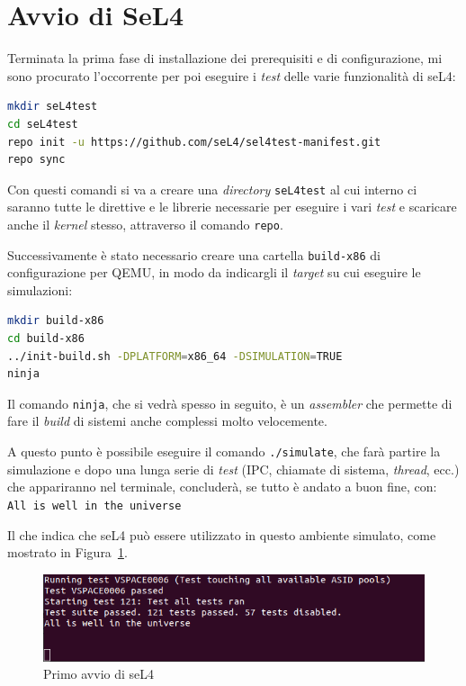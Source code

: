 \section{Avvio di SeL4}
Terminata la prima fase di installazione dei prerequisiti e di configurazione, mi sono procurato l'occorrente per poi eseguire i \textit{test} delle varie funzionalità di seL4:
\begin{lstlisting}[language=bash]
mkdir seL4test
cd seL4test
repo init -u https://github.com/seL4/sel4test-manifest.git
repo sync
\end{lstlisting}

Con questi comandi si va a creare una \textit{directory} \texttt{seL4test} al cui interno ci saranno tutte le direttive e le librerie necessarie per eseguire i vari \textit{test} e scaricare anche il \textit{kernel} stesso, attraverso il comando \texttt{repo}.

Successivamente è stato necessario creare una cartella \texttt{build-x86} di configurazione per QEMU, in modo da indicargli il \textit{target} su cui eseguire le simulazioni:
\begin{lstlisting}[language=bash]
mkdir build-x86
cd build-x86
../init-build.sh -DPLATFORM=x86_64 -DSIMULATION=TRUE
ninja
\end{lstlisting}

Il comando \texttt{ninja}, che si vedrà spesso in seguito, è un \textit{assembler} che permette di fare il \textit{build} di sistemi anche complessi molto velocemente.

A questo punto è possibile eseguire il comando \texttt{./simulate}, che farà partire la simulazione e dopo una lunga serie di \textit{test} (IPC, chiamate di sistema, \textit{thread}, ecc.) che appariranno nel terminale, concluderà, se tutto è andato a buon fine, con:\\
\texttt{All is well in the universe}

Il che indica che seL4 può essere utilizzato in questo ambiente simulato, come mostrato in Figura~\ref{fig:PrimaSimulazione}.
\begin{figure}[H]
  \includegraphics[width=\linewidth]{img/PrimaSimulazione.png}
  \caption{Primo avvio di seL4}
  \label{fig:PrimaSimulazione}
\end{figure}

